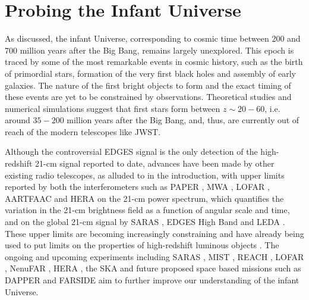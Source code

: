 
\setcounter{section}{0}
\renewcommand\thefigure{\arabic{chapter}.\arabic{figure}}
\renewcommand\thetable{\arabic{chapter}.\arabic{table}}
\renewcommand\thesubsection{\arabic{chapter}.\arabic{section}.\arabic{subsection}}
\renewcommand\thesection{\arabic{chapter}.\arabic{section}}
\setcounter{figure}{0}
\setcounter{table}{0}

\section{Probing the Infant Universe}\label{sec:intro_joint}

As discussed, the infant Universe, corresponding to cosmic time between 200 and 700 million years after the Big Bang, remains largely unexplored. This epoch is traced by some of the most remarkable events in cosmic history, such as the birth of primordial stars, formation of the very first black holes and assembly of early galaxies. The nature of the first bright objects to form and the exact timing of these events are yet to be constrained by observations. Theoretical studies and numerical simulations suggest that first stars form between $z\sim 20-60$, i.e. around $35-200$ million years after the Big Bang\cite{Bond_pop3_1981, Bromm_pop3_2004, Klessen2019}, and, thus, are currently out of reach of the modern telescopes like JWST. 

Although the controversial EDGES signal is the only detection of the high-redshift 21-cm signal reported to date, advances have been made by other existing radio telescopes, as alluded to in the introduction, with upper limits reported by both the interferometers such as PAPER \citep[Precision Array for Probing the Epoch of Reionization, ][]{Jacobs_Paper_limits_2015}, MWA \cite{Trott_mwa_2020, Kolopanis_MWA_limits_2022}, LOFAR \cite{Patil_2017, Mertens_2020}, AARTFAAC \citep[Amsterdam-ASTRON Radio Transients Facility And Analysis Center, ][]{AARTFAAC_2020} and HERA \cite{HERA_2022a, HERA_2022b, HERA_2022c} on the 21-cm power spectrum, which quantifies the variation in the 21-cm brightness field as a function of angular scale and time, and on the global  21-cm signal by SARAS \citep[][e.g. the previous two chapters]{Singh_saras2_2017, Singh_saras2_2018, Bevins_SARAS2_2022, Bevins_saras3_2022}, EDGES High Band \cite{Monsalve_EDGES_HB_1_2017, Monsalve_EDGES_HB_2_2018, Monsalve_EDGES_HB_3_2019} and LEDA \cite{Bernardi_LEDA_2016}. These upper limits are becoming increasingly constraining and have already being used to put limits on the  properties of high-redshift luminous objects \cite{Mondal_LOFAR_2020, HERA_2022b, HERA_2022c, Singh_saras2_2017, Singh_saras2_2018, Bevins_SARAS2_2022, Bevins_saras3_2022}. The ongoing and upcoming experiments including SARAS \cite{SARAS3}, MIST \cite{MIST}, REACH \cite{de_lera_acedo_reach_2022}, LOFAR \cite{LOFAR_current_EoR_2018}, NenuFAR \citep[ New Extension in Nançay Upgrading loFAR,][]{Zarka_nenuFar_2018}, HERA \cite{HERA_2017}, the SKA and future proposed space based missions such as DAPPER and FARSIDE \cite{Burns_Moon_2021} aim to further improve our understanding of the infant Universe.

